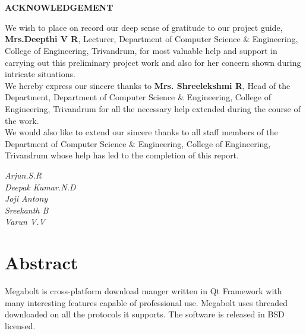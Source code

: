 \documentclass[pdftex,12pt,a4paper,pdfencoding=unicode]{article}
\begin{document}
\begin{onehalfspace}
\section*{}
\thispagestyle{empty}
\begin{center}
  {\bf ACKNOWLEDGEMENT}
\end{center}
We wish to place on record our deep sense of gratitude to our project guide, {\bf Mrs.Deepthi V R}, Lecturer, Department
of Computer Science \& Engineering, College of Engineering, Trivandrum, for most valuable help and support in carrying out this
preliminary project work and also for her concern shown during intricate situations.\\

\indent We hereby express our sincere thanks to {\bf Mrs. Shreelekshmi R}, Head of the Department, Department of Computer 
Science \& Engineering, College of Engineering, Trivandrum for all the necessary help extended during the course of the work.\\

\indent We would also like to extend our sincere thanks to all staff members of the Department of Computer Science \& 
Engineering, College of Engineering, Trivandrum whose help has led to the completion of this report.\\[1cm]
\begin{minipage}{0.4\textwidth}
  \begin{flushleft}
    {
    }
  \end{flushleft}
\end{minipage}
\begin{minipage}{0.4\textwidth}
  \begin{flushright}
    {
      \emph{Arjun.S.R\\Deepak Kumar.N.D\\ Joji Antony\\ Sreekanth B\\ Varun V.V\\}
    }
  \end{flushright}
\end{minipage}
\vfill
\newpage

\section*{\Large Abstract}
\thispagestyle{plain}
               Megabolt is cross-platform download manger written in Qt Framework with many interesting features
                capable of professional use. Megabolt uses threaded downloaded on all the protocols it supports.
                The software is released in BSD licensed.\\


\end{onehalfspace}
\end{document}
